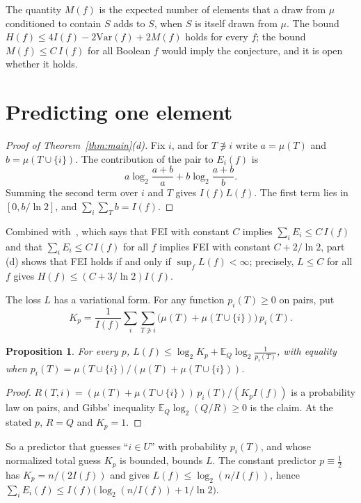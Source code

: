 \documentclass[11pt]{amsart}
\newtheorem{proposition}[theorem]{Proposition}
\theoremstyle{remark}
\newcommand{\Var}{\mathrm{Var}}
\newcommand{\E}{\mathbb{E}}
\begin{document}
The quantity $M(f)$ is the expected number of elements that a draw from $\mu$ conditioned to contain $S$ adds to $S$,
when $S$ is itself drawn from $\mu$. The bound $H(f)\le 4I(f)-2\Var(f)+2M(f)$ holds for every $f$; the bound
$M(f)\le C\,I(f)$ for all Boolean $f$ would imply the conjecture, and it is open whether it holds.

\section{Predicting one element}\label{sec:pred}

\begin{proof}[Proof of Theorem~\ref{thm:main}(d)]
Fix $i$, and for $T\not\ni i$ write $a=\mu(T)$ and $b=\mu(T\cup\{i\})$. The contribution of the pair to $E_i(f)$ is
\[
a\log_2\frac{a+b}{a}+b\log_2\frac{a+b}{b}.
\]
Summing the second term over $i$ and $T$ gives $I(f)L(f)$. The first term lies in $[0,b/\ln 2]$, and $\sum_i\sum_T
b=I(f)$.
\end{proof}

Combined with~\cite[Corollary~5]{Shm1}, which says that FEI with constant $C$ implies $\sum_iE_i\le C\,I(f)$ and that
$\sum_iE_i\le C\,I(f)$ for all $f$ implies FEI with constant $C+2/\ln2$, part (d) shows that FEI holds if and only if
$\sup_fL(f)<\infty$; precisely, $L\le C$ for all $f$ gives $H(f)\le(C+3/\ln2)I(f)$.

The loss $L$ has a variational form. For any function $p_i(T)\ge0$ on pairs, put
\[
K_p=\frac1{I(f)}\sum_{i}\sum_{T\not\ni i}\bigl(\mu(T)+\mu(T\cup\{i\})\bigr)\,p_i(T).
\]

\begin{proposition}\label{prop:var}
For every $p$, $L(f)\le\log_2K_p+\E_Q\log_2\frac1{p_i(T)}$, with equality when
$p_i(T)=\mu(T\cup\{i\})/(\mu(T)+\mu(T\cup\{i\}))$.
\end{proposition}

\begin{proof}
$R(T,i)=(\mu(T)+\mu(T\cup\{i\}))\,p_i(T)/(K_pI(f))$ is a probability law on pairs, and Gibbs' inequality
$\E_Q\log_2(Q/R)\ge0$ is the claim. At the stated $p$, $R=Q$ and $K_p=1$.
\end{proof}

So a predictor that guesses ``$i\in U$'' with probability $p_i(T)$, and whose normalized total guess $K_p$ is bounded,
bounds $L$. The constant predictor $p\equiv\tfrac12$ has $K_p=n/(2I(f))$ and gives $L(f)\le\log_2(n/I(f))$, hence
$\sum_iE_i(f)\le I(f)\bigl(\log_2(n/I(f))+1/\ln2\bigr)$.
\end{document}
